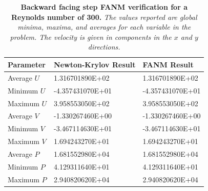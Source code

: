 \begin{table}[h!]
  \begin{center}
    \begin{tabular}{lll}\hline\hline
      \multicolumn{1}{l}{Parameter}& 
      \multicolumn{1}{l}{Newton-Krylov Result}&
      \multicolumn{1}{l}{FANM Result}\\
      \hline
      Average $U$ & 1.316701890E+02 & 1.316701890E+02 \\
      Minimum $U$ & -4.357431070E+01 & -4.357431070E+01 \\
      Maximum $U$ & 3.958553050E+02 & 3.958553050E+02 \\
      \hline
      Average $V$ & -1.330267460E+00 & -1.330267460E+00 \\
      Minimum $V$ & -3.467114630E+01 & -3.467114630E+01 \\
      Maximum $V$ & 1.694243270E+01 & 1.694243270E+01 \\
      \hline
      Average $P$ & 1.681552980E+04 & 1.681552980E+04 \\
      Minimum $P$ & 4.129311640E+01 & 4.129311640E+01 \\
      Maximum $P$ & 2.940820620E+04 & 2.940820620E+04 \\
      \hline\hline
    \end{tabular}
  \end{center}
  \caption{\textbf{Backward facing step FANM verification for a
      Reynolds number of 300.} \textit{The values reported are global
      minima, maxima, and averages for each variable in the
      problem. The velocity is given in components in the $x$ and $y$
      directions.}}
  \label{tab:step_re300_results}
\end{table}

